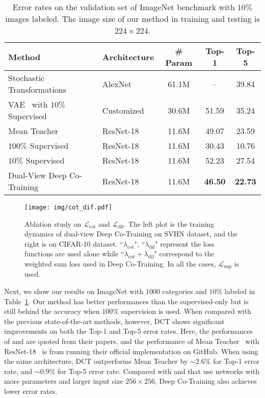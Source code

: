 \documentclass[runningheads]{llncs}
\begin{document}
\begin{table}
  \setlength{\tabcolsep}{6pt}
  \centering
  \begin{tabular}{llccc}
    \toprule
    Method & Architecture & \# Param & Top-1 & Top-5 \\
    \midrule
    Stochastic Transformations~\cite{stoc_trans} & AlexNet & 61.1M & -- & 39.84 \\
    VAE~\cite{vae} with $10\%$ Supervised & Customized & 30.6M & 51.59 & 35.24 \\
    Mean Teacher~\cite{mean} & ResNet-18 & 11.6M & 49.07 & 23.59 \\
    \midrule
    $100\%$ Supervised & ResNet-18 & 11.6M & 30.43 & 10.76 \\
    $10\%$ Supervised & ResNet-18 & 11.6M & 52.23 & 27.54 \\
    Dual-View Deep Co-Training & ResNet-18 & 11.6M & \bf 46.50 & \bf 22.73 \\
    \bottomrule
  \end{tabular}
  \vspace{0.05in}
  \caption{Error rates on the validation set of ImageNet benchmark with $10\%$ images labeled.
  The image size of our method in training and testing is $224\times 224$.}
  \label{tab:imagenet}
\end{table}\begin{figure}
  \texttt{[image: img/cot\_dif.pdf]}
  \caption{Ablation study on $\mathcal{L}_{\text{cot}}$ and $\mathcal{L}_{\text{dif}}$.
  The left plot is the training dynamics of dual-view Deep Co-Training on SVHN dataset,
  and the right is on CIFAR-10 dataset.
  ``$\lambda_{\text{cot}}$", ``$\lambda_{\text{dif}}$" represent the loss functions are used alone while ``$\lambda_{\text{cot}}+\lambda_{\text{dif}}$" correspond to the weighted sum loss used in Deep Co-Training.
  In all the cases, $\mathcal{L}_{\text{sup}}$ is used.
  }
  \label{fig:cot_dif}
\end{figure}

Next, we show our results on ImageNet with $1000$ categories and $10\%$ labeled in Table~\ref{tab:imagenet}.
Our method has better performances than the supervised-only but is still behind the accuracy when $100\%$ supervision is used.
When compared with the previous state-of-the-art methods, however, DCT shows significant improvements on both the Top-1 and Top-5 error rates.
Here, the performances of \cite{stoc_trans} and \cite{vae} are quoted from their papers, and the performance of Mean Teacher~\cite{mean} with ResNet-18~\cite{resnet} is from running their official implementation on GitHub.
When using the same architecture, DCT outperforms Mean Teacher by $\sim 2.6\%$ for Top-1 error rate, and $\sim 0.9\%$ for Top-5 error rate.
Compared with \cite{stoc_trans} and \cite{vae} that use networks with more parameters and larger input size $256\times256$, Deep Co-Training also achieves lower error rates.
\end{document}
